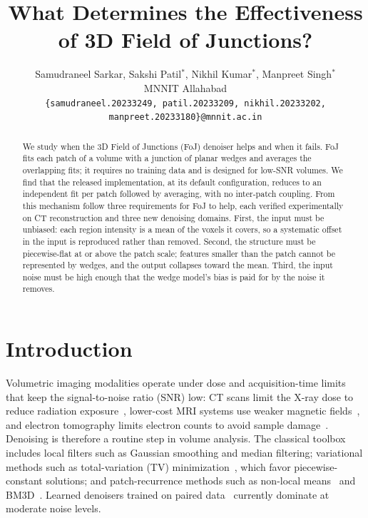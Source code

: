 \documentclass[11pt]{article}
\title{What Determines the Effectiveness of 3D Field of Junctions?}
\author{Samudraneel Sarkar, Sakshi Patil$^{*}$, Nikhil Kumar$^{*}$,
Manpreet Singh$^{*}$\\[1.4em]
MNNIT Allahabad\\
{\small\texttt{\{samudraneel.20233249, patil.20233209, nikhil.20233202,
manpreet.20233180\}@mnnit.ac.in}}}
\date{}
\begin{document}
\maketitle
\begingroup\renewcommand{\thefootnote}{}%
%
\endgroup

\begin{abstract}
We study when the 3D Field of Junctions (FoJ) denoiser helps and when it
fails. FoJ fits each patch of a volume with a junction of planar wedges
and averages the overlapping fits; it requires no training data and is
designed for low-SNR volumes. We find that the released implementation,
at its default configuration, reduces to an independent fit per patch
followed by averaging, with no inter-patch coupling. From this mechanism
follow three requirements for FoJ to help, each verified experimentally
on CT reconstruction and three new denoising domains.
First, the input must be unbiased: each region intensity is a mean of
the voxels it covers, so a systematic offset in the input is reproduced
rather than removed. Second, the structure must be piecewise-flat at or
above the patch scale; features smaller than the patch cannot be
represented by wedges, and the output collapses toward the mean. Third,
the input noise must be high enough that the wedge model's bias is paid
for by the noise it removes.
\end{abstract}

\section{Introduction}

Volumetric imaging modalities operate under dose and acquisition-time
limits that keep the signal-to-noise ratio (SNR) low: CT scans limit the
X-ray dose to reduce radiation exposure~\cite{lepcha2025low}, lower-cost
MRI systems use weaker magnetic fields~\cite{arnold2023low}, and electron
tomography limits electron counts to avoid sample
damage~\cite{turk2020promise}. Denoising is therefore a routine step in
volume analysis. The classical toolbox includes local filters such as
Gaussian smoothing
and median filtering; variational methods such as total-variation (TV)
minimization~\cite{rudin1992nonlinear,chambolle2004algorithm}, which
favor piecewise-constant solutions; and patch-recurrence methods such as
non-local means~\cite{buades2005nonlocal} and
BM3D~\cite{dabov2007image}. Learned denoisers trained on paired
data~\cite{zhang2017beyond} currently dominate at moderate noise levels.
\end{document}
